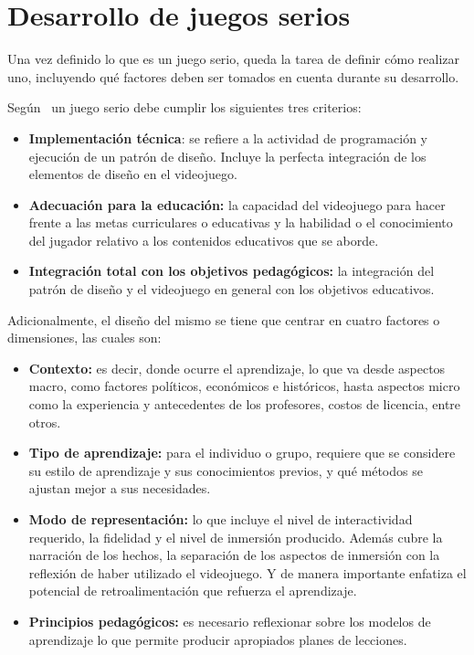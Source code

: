 \section{Desarrollo de juegos serios}
\label{sec:desarrollo}

Una vez definido lo que es un juego serio, queda la tarea de definir cómo
realizar uno, incluyendo qué factores deben ser tomados en cuenta durante su desarrollo.

Según~\cite{education:games} un juego serio debe cumplir los siguientes
tres criterios:

\begin{itemize}

\item \textbf{Implementación técnica}: se refiere a la actividad de programación
    y ejecución de un patrón de diseño. Incluye la perfecta integración de los
    elementos de diseño en el videojuego. 

\item \textbf{Adecuación para la educación:} la capacidad del videojuego para hacer
    frente a las metas curriculares o educativas y la habilidad o el
    conocimiento del jugador relativo a los contenidos educativos que se aborde.

\item \textbf{Integración total con los objetivos pedagógicos:} la integración
    del patrón de diseño y el videojuego en general con los objetivos
    educativos.

\end{itemize}


Adicionalmente, el diseño del mismo se tiene que centrar en cuatro factores o
dimensiones, las cuales son\cite{education:games}:

\begin{itemize}
\item \textbf{Contexto:} es decir, donde ocurre el aprendizaje, lo que va desde
    aspectos macro, como  factores políticos, económicos e históricos, hasta
    aspectos micro como la experiencia y  antecedentes de los profesores, costos
    de licencia, entre otros.
\item \textbf{Tipo de aprendizaje:} para el individuo o grupo, requiere que se
    considere su  estilo de aprendizaje y sus conocimientos previos, y qué
    métodos se ajustan mejor a sus  necesidades.
\item \textbf{Modo de representación:} lo que incluye el nivel de interactividad
    requerido, la fidelidad y  el nivel de inmersión producido. Además cubre la
    narración de los hechos, la separación de los  aspectos de inmersión con la
    reflexión de haber utilizado el videojuego. Y de manera importante  enfatiza
    el potencial de retroalimentación que refuerza el aprendizaje.
\item \textbf{Principios pedagógicos:} es necesario reflexionar sobre los
    modelos de aprendizaje lo  que permite producir apropiados planes de
    lecciones.
\end{itemize}

